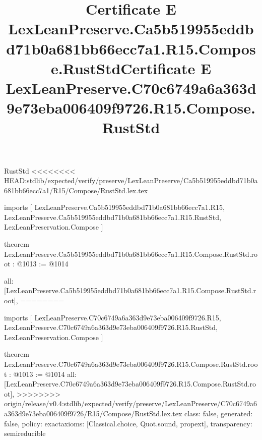 \begin{lexlean}{RustStd}
<<<<<<<< HEAD:stdlib/expected/verify/preserve/LexLeanPreserve/Ca5b519955eddbd71b0a681bb66ecc7a1/R15/Compose/RustStd.lex.tex
\title{Certificate E LexLeanPreserve.Ca5b519955eddbd71b0a681bb66ecc7a1.R15.Compose.RustStd}
\begin{coremodule}
imports [
  LexLeanPreserve.Ca5b519955eddbd71b0a681bb66ecc7a1.R15,
  LexLeanPreserve.Ca5b519955eddbd71b0a681bb66ecc7a1.R15.RustStd,
  LexLeanPreservation.Compose
]

theorem LexLeanPreserve.Ca5b519955eddbd71b0a681bb66ecc7a1.R15.Compose.RustStd.root : @1013 := @1014 {
  all: [LexLeanPreserve.Ca5b519955eddbd71b0a681bb66ecc7a1.R15.Compose.RustStd.root],
========
\title{Certificate E LexLeanPreserve.C70c6749a6a363d9e73eba006409f9726.R15.Compose.RustStd}
\begin{coremodule}
imports [
  LexLeanPreserve.C70c6749a6a363d9e73eba006409f9726.R15,
  LexLeanPreserve.C70c6749a6a363d9e73eba006409f9726.R15.RustStd,
  LexLeanPreservation.Compose
]

theorem LexLeanPreserve.C70c6749a6a363d9e73eba006409f9726.R15.Compose.RustStd.root : @1013 := @1014 {
  all: [LexLeanPreserve.C70c6749a6a363d9e73eba006409f9726.R15.Compose.RustStd.root],
>>>>>>>> origin/release/v0.4:stdlib/expected/verify/preserve/LexLeanPreserve/C70c6749a6a363d9e73eba006409f9726/R15/Compose/RustStd.lex.tex
  class: false,
  generated: false,
  policy: exact{axioms: [Classical.choice, Quot.sound, propext]},
  transparency: semireducible
}


\end{coremodule}}
\end{coremodule}
\end{lexlean}
